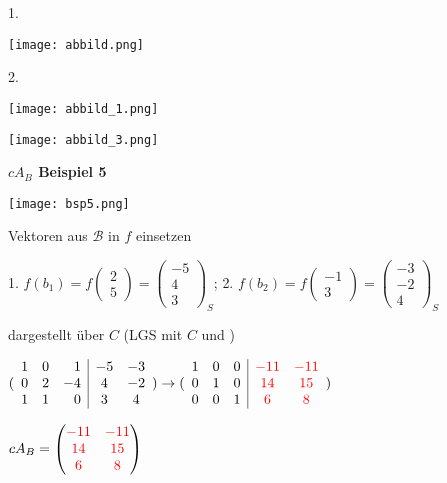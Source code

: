 \begin{multicols*}{3}
    {1.}

    {\texttt{[image: abbild.png]}}

    {2.}

    {\texttt{[image: abbild\_1.png]}}

    {\texttt{[image: abbild\_3.png]}}

    {\textbf{$cA_B$ Beispiel 5} }

    {\texttt{[image: bsp5.png]}}

    { Vektoren aus $\mathcal{B} $ in $f$ einsetzen}

    {1. $ f(b_1) = f(\begin{matrix}
                2 \\
                5
            \end{matrix}) = \begin{pmatrix}
                -5 \\
                4  \\
                3
            \end{pmatrix}_S$; }{ 2. $ f(b_2) = f(\begin{matrix}
                -1 \\
                3
            \end{matrix}) = \begin{pmatrix}
                -3 \\
                -2 \\
                4
            \end{pmatrix}_S$}

    { dargestellt über $C$ (LGS mit $C$ und )}


    {$( \begin{array}{rrr|cc}
                1 & 0 & 1  & -5 & -3 \\
                0 & 2 & -4 & 4  & -2 \\
                1 & 1 & 0  & 3  & 4
            \end{array})
            \to
            (\begin{array}{rrr|cc}
                    1 & 0 & 0 & {\color{red}-11} & {\color{red}-11} \\
                    0 & 1 & 0 & {\color{red}14}  & {\color{red}15}  \\
                    0 & 0 & 1 & {\color{red}6}   & {\color{red}8}
                \end{array})
        $}

    {$cA_B = \begin{pmatrix}
                {\color{red}-11} & {\color{red}-11} \\
                {\color{red}14}  & {\color{red}15}  \\
                {\color{red}6}   & {\color{red}8}
            \end{pmatrix}$}



\end{multicols*}
